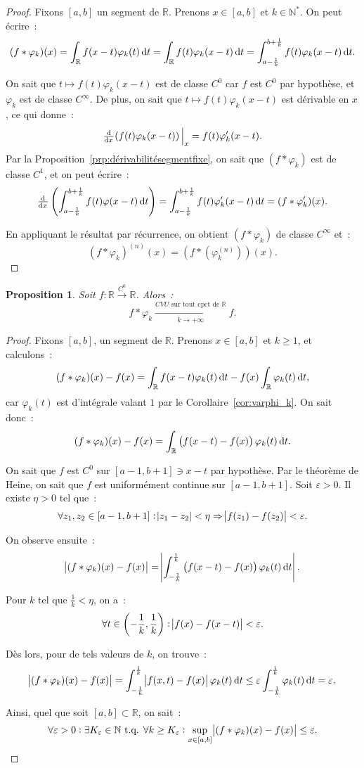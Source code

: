 \documentclass{report}
\newtheorem{prp}[thm]{Proposition}
\theoremstyle{definition}
\theoremstyle{remark}
\newcommand{\R}{\mathbb R}
\newcommand{\N}{\mathbb N}
\newcommand{\Ns}{\N^{*}}
\newcommand{\tq}{\text{ t.q. }}
\newcommand{\CONV}[5]{\xrightarrow[#2 \to #3]{#4 \text{ #5 } #1}}
\newcommand{\CVUc}[3]{\CONV{#1}{#2}{#3}{CVU}{sur tout cpct de}}
\newcommand{\toC}[1]{\xrightarrow{C^{#1}}}
\newcommand{\pinfty}{{+\infty}}
\begin{document}
			\begin{proof} Fixons $[a, b]$ un segment de $\R$. Prenons $x \in [a, b]$ et $k \in \Ns$. On peut écrire~:
			\[(f * \varphi_k)(x) = \int_\R f(x-t)\varphi_k(t)\dif t = \int_\R f(t)\varphi_k(x-t)\dif t = \int_{a-\frac 1k}^{b+\frac 1k}f(t)\varphi_k(x-t)\dif t.\]

			On sait que $t \mapsto f(t)\varphi_k(x-t)$ est de classe $C^0$ car $f$ est $C^0$ par hypothèse, et $\varphi_k$ est de classe $C^\infty$. De plus, on
			sait que $t \mapsto f(t)\varphi_k(x-t)$ est dérivable en $x$, ce qui donne~:
			\[\od {}x(f(t)\varphi_k(x-t))\sVert[2]_x = f(t)\varphi_k'(x-t).\]
			Par la Proposition~\ref{prp:dérivabilitésegmentfixe}, on sait que $(f*\varphi_k)$ est de classe $C^1$, et on peut écrire~:
			\[\od {}x\left(\int_{a-\frac 1k}^{b+\frac 1k}f(t)\varphi(x-t)\dif t\right) = \int_{a-\frac 1k}^{b+\frac 1k}f(t)\varphi_k'(x-t)\dif t = (f * \varphi_k')(x).\]

			En appliquant le résultat par récurrence, on obtient $(f*\varphi_k)$ de classe $C^\infty$ et~:
			\[\left(f*\varphi_k\right)^{(n)}(x) = \left(f*\left(\varphi_k^{(n)}\right)\right)(x).\]
			\end{proof}

			\begin{prp}\label{prp:f*varphi_k CVUc f} Soit $f : \R \toC0 \R$. Alors~:
			\[f*\varphi_k \CVUc \R k\pinfty f.\]
			\end{prp}

			\begin{proof} Fixons $[a, b]$, un segment de $\R$. Prenons $x \in [a, b]$ et $k \geq 1$, et calculons~:
			\[(f*\varphi_k)(x)-f(x) = \int_\R f(x-t)\varphi_k(t)\dif t - f(x)\int_\R\varphi_k(t)\dif t,\]
			car $\varphi_k(t)$ est d'intégrale valant $1$ par le Corollaire~\ref{cor:varphi_k}. On sait donc~:
			\[(f*\varphi_k)(x) - f(x) = \int_\R \left(f(x-t)-f(x)\right)\varphi_k(t)\dif t.\]

			On sait que $f$ est $C^0$ sur $[a-1, b+1] \ni x-t$ par hypothèse. Par le théorème de Heine, on sait que $f$ est uniformément continue sur $[a-1, b+1]$.
			Soit $\varepsilon > 0$. Il existe $\eta > 0$ tel que~:
			\[\forall z_1, z_2 \in [a-1, b+1] : \abs {z_1-z_2} < \eta \Rightarrow \abs {f(z_1)-f(z_2)} < \varepsilon.\]

			On observe ensuite~:
			\[\abs {(f*\varphi_k)(x)-f(x)} = \abs {\int_{-\frac 1k}^{\frac 1k}\left(f(x-t)-f(x)\right)\varphi_k(t)\dif t}.\]

			Pour $k$ tel que $\frac 1k < \eta$, on a~:
			\[\forall t \in \left(-\frac 1k, \frac 1k\right) : \abs {f(x)-f(x-t)} < \varepsilon.\]

			Dès lors, pour de tels valeurs de $k$, on trouve~:
			\[\abs {(f*\varphi_k)(x)-f(x)} = \int_{-\frac 1k}^{\frac 1k}\abs {f(x, t)-f(x)}\varphi_k(t)\dif t
				\leq \varepsilon\int_{-\frac 1k}^{\frac 1k}\varphi_k(t)\dif t = \varepsilon.\]

			Ainsi, quel que soit $[a, b] \subset \R$, on sait~:
			\[\forall \varepsilon > 0 : \exists K_\varepsilon \in \N \tq \forall k \geq K_\varepsilon : \sup_{x \in [a, b]}\abs {(f*\varphi_k)(x)-f(x)} \leq \varepsilon.\]
			\end{proof}
\end{document}
